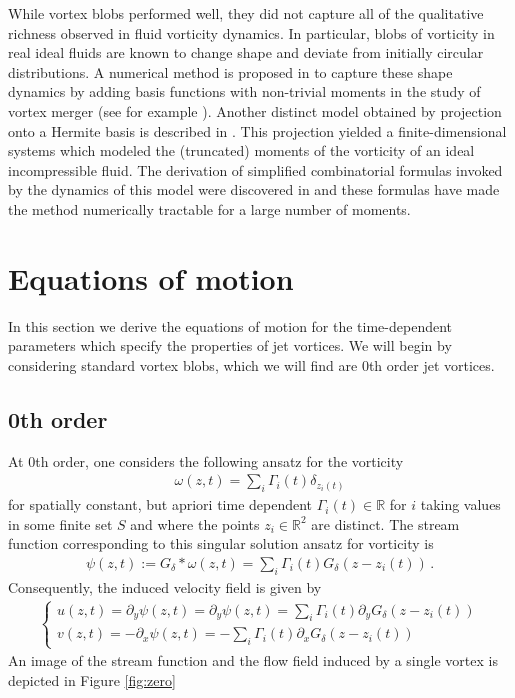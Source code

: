 \documentclass[12pt]{amsart}
\newcommand{\R}{\ensuremath{\mathbb{R}}}
\theoremstyle{remark}
\begin{document}
While vortex blobs performed well, they did not capture all of the qualitative richness observed in fluid vorticity dynamics.
In particular, blobs of vorticity in real ideal fluids are known to change shape and deviate from initially circular distributions.
A numerical method is proposed in \cite{Rossi1997,Rossi2005} to capture these shape dynamics by adding
basis functions with non-trivial moments in the study of vortex merger (see for example \cite{MelanderZabuskyMcWilliams1998,DizesVerga2002,MeunierDizesLeweke2005}).
Another distinct model obtained by projection onto a Hermite basis is described in \cite{NagemSandriUminskyWayne2009}.
This projection yielded a finite-dimensional systems which modeled the (truncated) moments of the vorticity of an ideal incompressible fluid.
The derivation of simplified combinatorial formulas invoked by the dynamics of this model were discovered in \cite{UminskyWayneBarbaro2010}
and these formulas have made the method numerically tractable for a large number of moments.

\section{Equations of motion}
\label{sec:EOM}
In this section we derive the equations of motion for the time-dependent parameters which specify the properties of jet vortices.
We will begin by considering standard vortex blobs, which we will find are $0$th order jet vortices.

\subsection{0th order}
At 0th order, one considers the following ansatz for the vorticity
\begin{align}
  \omega(z,t) = \sum_{i} \Gamma_i(t) \delta_{z_i(t)} \label{eq:ansatz 0}
\end{align}
for spatially constant, but apriori time dependent $\Gamma_i(t) \in \R$ for $i$ taking values in some finite set $S$
and where the points $z_i \in \R^2$ are distinct.
The stream function corresponding to this singular solution ansatz for vorticity is 
\begin{align*}
  \psi(z,t) := G_\delta * \omega(z,t) =  \sum_{i} \Gamma_i(t) G_\delta (z-z_i(t) )\,.
\end{align*}
Consequently, the induced velocity field is given by
\begin{align}
\begin{cases}
  u(z,t) = \partial_y \psi(z,t) =  \partial_y \psi (z,t) = \sum_{i} \Gamma_i(t) \partial_y G_\delta (z-z_i(t) ) \\
  v(z,t) = - \partial_x \psi (z,t) = - \sum_{i} \Gamma_i(t) \partial_x G_\delta (z-z_i(t) )
\end{cases} \label{eq:u 0}
\end{align}
%
An image of the stream function and the flow field induced by a single vortex is depicted in Figure \ref{fig:zero}
\end{document}
